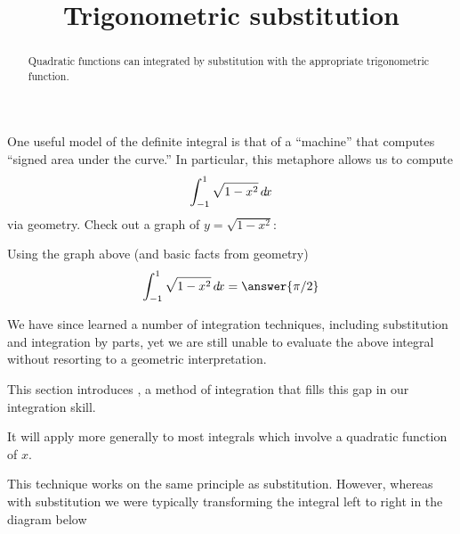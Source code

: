 \documentclass{ximera}
\title[Dig-In:]{Trigonometric substitution}
\begin{document}
\begin{abstract}
  Quadratic functions can integrated by substitution with the
  appropriate trigonometric function.
\end{abstract}
\maketitle



One useful model of the definite integral is that of a ``machine''
that computes ``signed area under the curve.'' In particular, this
metaphore allows us to compute
\[
\int_{-1}^1 \sqrt{1-x^2} \mathop{}\!d\! x
\]
via geometry. Check out a graph of $y= \sqrt{1-x^2}$:
\begin{image}
\end{image}

\begin{question}
  Using the graph above (and basic facts from geometry)
  \[
  \int_{-1}^1 \sqrt{1-x^2} \d x = \answer{\pi/2}
  \]
\end{question}

We have since learned a number of integration techniques, including
substitution and integration by parts, yet we are still unable to
evaluate the above integral without resorting to a geometric
interpretation.

This section introduces , a method of
integration that fills this gap in our integration skill.

It will apply more generally to most integrals which involve a quadratic function of $x$.

This technique works on the same principle as substitution. However,
whereas with substitution we were typically transforming the integral
left to right in the diagram below
\end{document}
